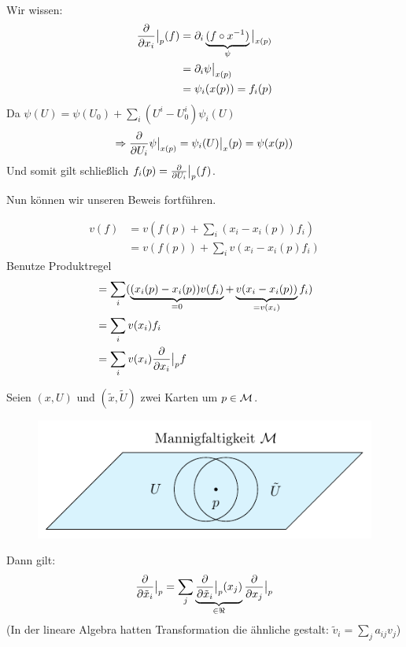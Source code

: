 \begin{bew}
\begin{align}
\end{align}
Wir wissen:
\begin{align}
\pdv{x_i}\big\vert_{p} (f) &= \partial_i \underbrace{(f \circ x^{-1})}_{\psi} \big \vert_{x(p)} \\
&= \partial_i \psi \big\vert_{x(p)}\\
&= \psi_i (x(p)) = f_i (p)
\end{align}
Da $\psi(U) = \psi(U_0) + \sum_i (U^i - U^i_0)\psi_i(U)$
\begin{align}
\Rightarrow \pdv{U_i} \psi \big\vert_{x(p)} = \psi_i(U) \big\vert_x(p) = \psi(x(p))
\end{align}
Und somit gilt schließlich $f_i (p) = \pdv{U_i} \big\vert_p (f)$.
\end{bew}

Nun können wir unseren Beweis fortführen.

\begin{bew} \leavevmode
\begin{align}
v(f) &= v(f(p) + \sum_i (x_i - x_i(p)) f_i) \\
&= v(f(p)) + \sum_i v(x_i - x_i (p) f_i)
\end{align}
Benutze Produktregel
\begin{align}
&= \sum_i (\underbrace{(x_i (p) - x_i (p)) v(f_i)}_{=0} + \underbrace{v(x_i - x_i (p))}_{=v(x_i)} f_i) \\
&= \sum_i v(x_i) f_i \\
&= \sum_i v(x_i) \pdv{x_i} \big\vert_p f 
\end{align}
\end{bew}


\begin{satz}[Transformationsregel]
Seien $(x, U)$ und $(\tilde{x}, \tilde{U})$ zwei Karten um $p \in \mathcal{M}$. 
\begin{figure}[H]
\centering
\includegraphics[scale=0.8]{figures/tikz/transformationlaw.pdf}
\label{img:transformationsregel}
\end{figure} 

Dann gilt:
\begin{align}
\pdv{\tilde{x}_i} \big\vert_p  = \sum_j \underbrace{\pdv{\tilde{x}_i} \big\vert_p  (x_j)}_{\in \real} \pdv{x_j} \big\vert_p 
\end{align}
(In der lineare Algebra hatten Transformation die ähnliche gestalt: $\tilde{v}_i = \sum_j a_{i j } v_j$)
\end{satz}


